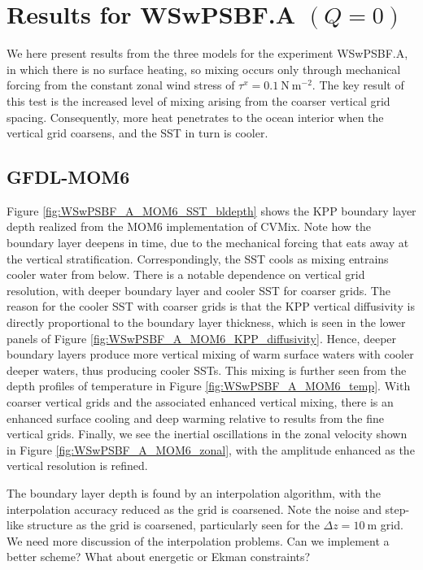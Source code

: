 \section{Results for WSwPSBF.A $(Q=0)$}
\label{section:WSwPSBFA}

We here present results from the three models for the experiment
WSwPSBF.A, in which there is no surface heating, so mixing occurs only
through mechanical forcing from the constant zonal wind stress of
$\tau^{x} = 0.1~\mbox{N}~\mbox{m}^{-2}$.  The key result of this test
is the increased level of mixing arising from the coarser vertical
grid spacing.  Consequently, more heat penetrates to the ocean
interior when the vertical grid coarsens, and the SST in turn is
cooler.

\subsection{GFDL-MOM6} 

Figure \ref{fig:WSwPSBF_A_MOM6_SST_bldepth} shows the KPP boundary
layer depth realized from the MOM6 implementation of CVMix.  Note how
the boundary layer deepens in time, due to the mechanical forcing that
eats away at the vertical stratification.  Correspondingly, the SST
cools as mixing entrains cooler water from below.  There is a notable
dependence on vertical grid resolution, with deeper boundary layer and
cooler SST for coarser grids.  The reason for the cooler SST with
coarser grids is that the KPP vertical diffusivity is directly
proportional to the boundary layer thickness, which is seen in the
lower panels of Figure \ref{fig:WSwPSBF_A_MOM6_KPP_diffusivity}.
Hence, deeper boundary layers produce more vertical mixing of warm
surface waters with cooler deeper waters, thus producing cooler SSTs.
This mixing is further seen from the depth profiles of temperature in
Figure \ref{fig:WSwPSBF_A_MOM6_temp}.  With coarser vertical grids and
the associated enhanced vertical mixing, there is an enhanced surface
cooling and deep warming relative to results from the fine vertical
grids.  Finally, we see the inertial oscillations in the zonal
velocity shown in Figure \ref{fig:WSwPSBF_A_MOM6_zonal}, with the
amplitude enhanced as the vertical resolution is refined.

The boundary layer depth is found by an interpolation algorithm, with
the interpolation accuracy reduced as the grid is coarsened.  Note the
noise and step-like structure as the grid is coarsened, particularly
seen for the $\Delta z = 10~\mbox{m}$ grid.  \color{red} We need more
discussion of the interpolation problems.  Can we implement a better
scheme?  What about energetic or Ekman constraints?  \color{black}


